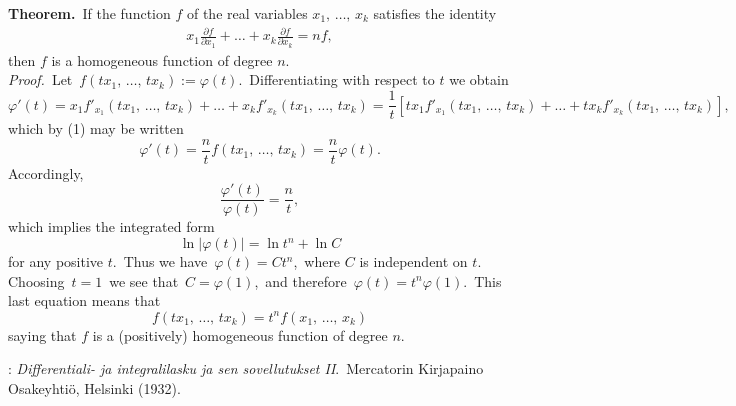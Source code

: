\documentclass[12pt]{article}
\theoremstyle{definition}
\begin{document}
\textbf{Theorem.}\, If the function $f$ of the real variables $x_1,\,\ldots,\,x_k$ satisfies the identity
\begin{align}
x_1\frac{\partial f}{\partial x_1}+\ldots+x_k\frac{\partial f}{\partial x_k} = nf,
\end{align}
then $f$ is a homogeneous function of degree $n$.\\


{\em Proof.}\, Let\, $f(tx_1,\,\ldots,\,tx_k) := \varphi(t)$.\, Differentiating with respect to $t$ we obtain
$$\varphi'(t) = x_1f'_{x_1}(tx_1,\,\ldots,\,tx_k)+\ldots+x_kf'_{x_k}(tx_1,\,\ldots,\,tx_k) 
= \frac{1}{t}[tx_1f'_{x_1}(tx_1,\,\ldots,\,tx_k)+\ldots+tx_kf'_{x_k}(tx_1,\,\ldots,\,tx_k)],$$
which by (1) may be written
$$\varphi'(t) = \frac{n}{t}f(tx_1,\,\ldots,\,tx_k) = \frac{n}{t}\varphi(t).$$
Accordingly,
$$\frac{\varphi'(t)}{\varphi(t)} = \frac{n}{t},$$
which implies the integrated form
$$\ln|\varphi(t)| = \ln{t^n}+\ln{C}$$
for any positive $t$.\, Thus we have\, $\varphi(t) = Ct^n$,\, where $C$ is independent on $t$.\, Choosing\, $t = 1$\, we see that\, $C = \varphi(1)$,\, and therefore\, $\varphi(t) = t^n\varphi(1)$.\, This last equation means that
$$f(tx_1,\,\ldots,\,tx_k) = t^nf(x_1,\,\ldots,\,x_k)$$
saying that $f$ is a (positively) homogeneous function of degree $n$.

\begin{thebibliography}{8}
: {\em Differentiali- ja integralilasku
ja sen sovellutukset II}.\, Mercatorin Kirjapaino Osakeyhti\"o, Helsinki (1932).
\end{thebibliography} 

\end{document}
